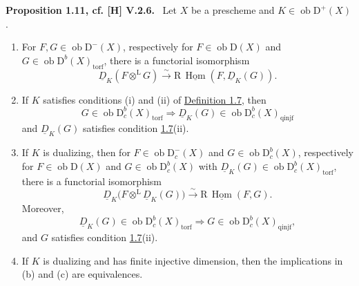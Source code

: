 \documentclass[11pt]{article}
\newenvironment{statement}[1]{\par\medskip\noindent\textbf{#1.}\ }{\par\medskip}
\DeclareMathOperator{\Hom}{Hom}
\newcommand{\R}{\mathrm{R}}
\newcommand{\D}{\mathrm{D}}
\newcommand{\ob}{\operatorname{ob}}
\providecommand{\Hom}{\operatorname{Hom}}
\providecommand{\ob}{\operatorname{ob}}
\providecommand{\R}{\mathrm R}
\providecommand{\Hom}{\operatorname{Hom}}
\begin{document}
\label{sga5:I:proposition:1.11}\begin{statement}{Proposition 1.11, cf. [H] V.2.6}
Let $X$ be a prescheme and $K\in\ob\D^+(X)$.
\begin{enumerate}[label=\alph*)]
\item For $F,G\in\ob\D^-(X)$, respectively for $F\in\ob\D(X)$ and $G\in\ob\D^b(X)_{\mathrm{torf}}$, there is a functorial isomorphism
\[
   \underline D_K(F\otimes^{\mathrm L}G)\xrightarrow{\sim}
   \R\,\underline{\Hom}(F,\underline D_K(G)).
\]

\item If $K$ satisfies conditions (i) and (ii) of \hyperref[sga5:I:definition:1.7]{Definition 1.7}, then
\[
   G\in\ob\D_c^b(X)_{\mathrm{torf}}
   \Longrightarrow
   \underline D_K(G)\in\ob\D_c^b(X)_{\mathrm{qinjf}}
\]
and $\underline D_K(G)$ satisfies condition \hyperref[sga5:I:definition:1.7]{1.7}(ii).

\item If $K$ is dualizing, then for $F\in\ob\D_c^-(X)$ and $G\in\ob\D_c^b(X)$, respectively for $F\in\ob\D(X)$ and $G\in\ob\D_c^b(X)$ with $\underline D_K(G)\in\ob\D_c^b(X)_{\mathrm{torf}}$, there is a functorial isomorphism
\[
   \underline D_K\bigl(F\otimes^{\mathrm L}\underline D_K(G)\bigr)
      \xrightarrow{\sim}\R\,\underline{\Hom}(F,G).
\]
Moreover,
\[
   \underline D_K(G)\in\ob\D_c^b(X)_{\mathrm{torf}}
   \Longrightarrow
   G\in\ob\D_c^b(X)_{\mathrm{qinjf}},
\]
and $G$ satisfies condition \hyperref[sga5:I:definition:1.7]{1.7}(ii).

\item If $K$ is dualizing and has finite injective dimension, then the implications in (b) and (c) are equivalences.
\end{enumerate}
\end{statement}
\end{document}
